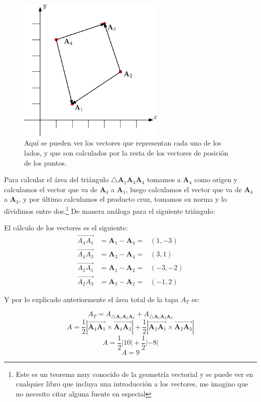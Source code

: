 \begin{figure}
 \centering
 \includegraphics[width=7cm]{img/01/vectores_cuerpo}
 \caption[Cálculo del área de un cuadrilátero]{ 
Aquí se pueden ver los vectores que representan cada uno de los lados, y que son calculados por la resta de los vectores de posición de los puntos.
 } \label{vectorArista:fig}
\end{figure}

Para calcular el área del triángulo $\bigtriangleup \textbf{A}_1 \textbf{A}_3 \textbf{A}_4$ tomamos a $\textbf{A}_4$ como origen y calculamos el vector que va de $\textbf{A}_4$ a $\textbf{A}_1$, luego calculamos el vector que va de $\textbf{A}_4$ a $\textbf{A}_3$, y por último calculamos el producto cruz, tomamos su norma y lo dividimos entre dos.\footnote{Este es un teorema muy conocido de la geometría vectorial y se puede ver en cualquier libro que incluya una introducción a los vectores, me imagino que no necesito citar alguna fuente en especial}
De manera análoga para el siguiente triángulo:

El cálculo de los vectores es el siguiente:
\begin{eqnarray}
\overrightarrow{A_4 A_1} & = \textbf{A}_1 - \textbf{A}_4 = & (1, -3) \nonumber \\
\overrightarrow{A_4 A_3} & = \textbf{A}_3 - \textbf{A}_4 = & (3, 1) \nonumber \\
\overrightarrow{A_2 A_1} & = \textbf{A}_1 - \textbf{A}_2 = & (-3, -2) \nonumber \\
\overrightarrow{A_2 A_3} & = \textbf{A}_3 - \textbf{A}_2 = & (-1, 2) \nonumber
\end{eqnarray}

Y por lo explicado anteriormente el área total de la tapa $A_T$ es:

$$ A_T = A_{\bigtriangleup \textbf{A}_1 \textbf{A}_3 \textbf{A}_4} + A_{\bigtriangleup \textbf{A}_1 \textbf{A}_2 \textbf{A}_3} $$
$$ A = \frac{1}{2} | \overrightarrow{\textbf{A}_4 \textbf{A}_1} \times \overrightarrow{\textbf{A}_4 \textbf{A}_3} | + \frac{1}{2} | \overrightarrow{\textbf{A}_2 \textbf{A}_1} \times \overrightarrow{\textbf{A}_2 \textbf{A}_3} |$$
$$A = \frac{1}{2} | 10 | + \frac{1}{2} | -8 |$$
$$A = 9$$

